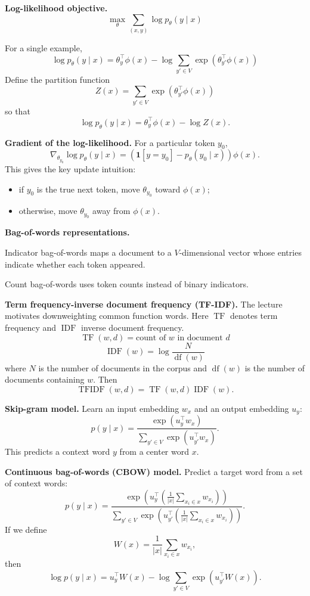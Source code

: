 \documentclass[11pt]{article}
\begin{document}
\textbf{Log-likelihood objective.}
\[
\max_\theta \sum_{(x,y)} \log p_\theta(y \mid x)
\]

For a single example,
\[
\log p_\theta(y \mid x) = \theta_y^\top \phi(x) - \log \sum_{y' \in V} \exp\!\left(\theta_{y'}^\top \phi(x)\right)
\]
Define the partition function
\[
Z(x) = \sum_{y' \in V} \exp\!\left(\theta_{y'}^\top \phi(x)\right)
\]
so that
\[
\log p_\theta(y \mid x) = \theta_y^\top \phi(x) - \log Z(x).
\]

\textbf{Gradient of the log-likelihood.} For a particular token \(y_0\),
\[
\nabla_{\theta_{y_0}} \log p_\theta(y \mid x)
= \left(\mathbf{1}[y=y_0] - p_\theta(y_0 \mid x)\right)\phi(x).
\]
This gives the key update intuition:
\begin{itemize}
    \item if \(y_0\) is the true next token, move \(\theta_{y_0}\) toward \(\phi(x)\);
    \item otherwise, move \(\theta_{y_0}\) away from \(\phi(x)\).
\end{itemize}

\textbf{Bag-of-words representations.}

Indicator bag-of-words maps a document to a \(V\)-dimensional vector whose entries indicate whether each token appeared.

Count bag-of-words uses token counts instead of binary indicators.

\textbf{Term frequency-inverse document frequency (TF-IDF).} The lecture motivates downweighting common function words. Here \(\operatorname{TF}\) denotes term frequency and \(\operatorname{IDF}\) inverse document frequency.
\[
\operatorname{TF}(w,d) = \text{count of } w \text{ in document } d
\]
\[
\operatorname{IDF}(w) = \log \frac{N}{\operatorname{df}(w)}
\]
where \(N\) is the number of documents in the corpus and \(\operatorname{df}(w)\) is the number of documents containing \(w\). Then
\[
\operatorname{TFIDF}(w,d) = \operatorname{TF}(w,d)\operatorname{IDF}(w).
\]

\textbf{Skip-gram model.} Learn an input embedding \(w_x\) and an output embedding \(u_y\):
\[
p(y \mid x) = \frac{\exp\!\left(u_y^\top w_x\right)}
{\sum_{y' \in V} \exp\!\left(u_{y'}^\top w_x\right)}.
\]
This predicts a context word \(y\) from a center word \(x\).

\textbf{Continuous bag-of-words (CBOW) model.} Predict a target word from a set of context words:
\[
p(y \mid x) = \frac{\exp\!\left(u_y^\top \left(\frac{1}{|x|}\sum_{x_i \in x} w_{x_i}\right)\right)}
{\sum_{y' \in V} \exp\!\left(u_{y'}^\top \left(\frac{1}{|x|}\sum_{x_i \in x} w_{x_i}\right)\right)}.
\]
If we define
\[
W(x) = \frac{1}{|x|}\sum_{x_i \in x} w_{x_i},
\]
then
\[
\log p(y \mid x) = u_y^\top W(x) - \log \sum_{y' \in V} \exp\!\left(u_{y'}^\top W(x)\right).
\]
\end{document}
